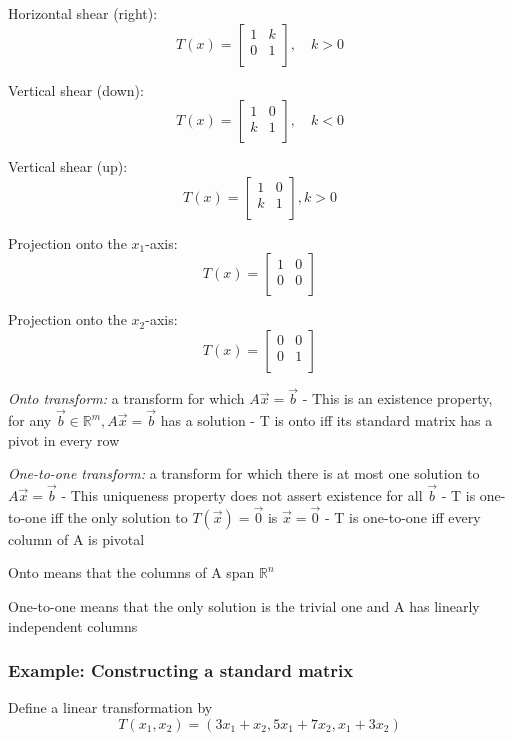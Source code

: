 \documentclass[12pt]{article} %
\newcommand{\R}{\mathbb{R}}
\begin{document}
Horizontal shear (right):
$$T(x) = \begin{bmatrix}
	1 & k\\
	0 & 1\\
\end{bmatrix}, \quad k > 0$$

Vertical shear (down):
$$T(x) = \begin{bmatrix}
	1 & 0\\
	k & 1\\
\end{bmatrix}, \quad k < 0$$

Vertical shear (up):
$$T(x) = \begin{bmatrix}
	1 & 0\\
	k & 1\\
\end{bmatrix}, k > 0$$

Projection onto the $x_1$-axis:
$$T(x) = \begin{bmatrix}
	1 & 0\\
	0 & 0\\
\end{bmatrix}$$

Projection onto the $x_2$-axis:
$$T(x) = \begin{bmatrix}
	0 & 0\\
	0 & 1\\
\end{bmatrix}$$

 \emph{Onto transform:} a transform for which $A\vec{x} = \vec{b}$
 \quad - This is an existence property, for any $\vec{b} \in \R^m, A\vec{x} = \vec{b}$ has a solution
 \quad - T is onto iff its standard matrix has a pivot in every row

 \emph{One-to-one transform:} a transform for which there is at most one solution to $ A\vec{x} = \vec{b}$
 \quad - This uniqueness property does not assert existence for all $\vec{b}$
 \quad - T is one-to-one iff the only solution to $T(\vec{x}) = \vec{0}$ is $\vec{x} = \vec{0}$
 \quad - T is one-to-one iff every column of A is pivotal

 Onto means that the columns of A span $\R^n$

 One-to-one means that the only solution is the trivial one and A has linearly independent columns

\subsubsection{Example: Constructing a standard matrix}
Define a linear transformation by
$$T(x_1, x_2) = (3x_1 + x_2, 5x_1 + 7x_2, x_1 + 3x_2)$$
\end{document}
